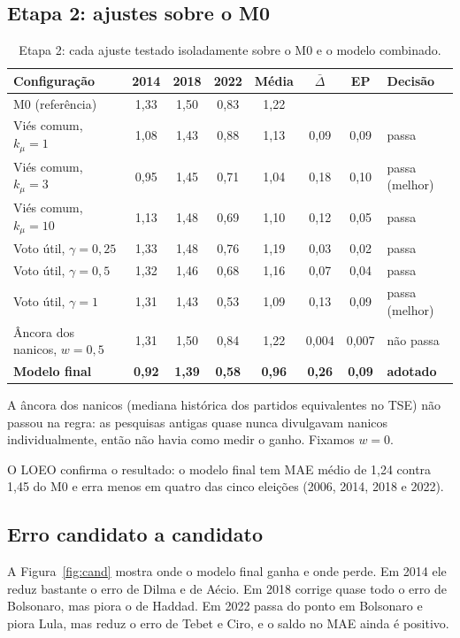 \documentclass[10.5pt,a4paper]{article}
\begin{document}
\subsection{Etapa 2: ajustes sobre o M0}
\begin{table}[h]
\centering\small
\caption{Etapa 2: cada ajuste testado isoladamente sobre o M0 e o modelo combinado.}
\label{tab:etapa2}
\begin{tabular}{lccccccl}
\toprule
Configuração & 2014 & 2018 & 2022 & Média & $\bar\Delta$ & EP & Decisão \\
\midrule
M0 (referência) & 1,33 & 1,50 & 0,83 & 1,22 & & & \\
\midrule
Viés comum, $k_\mu=1$ & 1,08 & 1,43 & 0,88 & 1,13 & 0,09 & 0,09 & passa \\
\rowcolor{azulclaro} Viés comum, $k_\mu=3$ & 0,95 & 1,45 & 0,71 & 1,04 & 0,18 & 0,10 & passa (melhor) \\
Viés comum, $k_\mu=10$ & 1,13 & 1,48 & 0,69 & 1,10 & 0,12 & 0,05 & passa \\
\midrule
Voto útil, $\gamma=0{,}25$ & 1,33 & 1,48 & 0,76 & 1,19 & 0,03 & 0,02 & passa \\
Voto útil, $\gamma=0{,}5$ & 1,32 & 1,46 & 0,68 & 1,16 & 0,07 & 0,04 & passa \\
\rowcolor{azulclaro} Voto útil, $\gamma=1$ & 1,31 & 1,43 & 0,53 & 1,09 & 0,13 & 0,09 & passa (melhor) \\
\midrule
Âncora dos nanicos, $w=0{,}5$ & 1,31 & 1,50 & 0,84 & 1,22 & 0,004 & 0,007 & não passa \\
\midrule
\rowcolor{verde!12} \textbf{Modelo final} & \textbf{0,92} & \textbf{1,39} & \textbf{0,58} & \textbf{0,96} & \textbf{0,26} & \textbf{0,09} & \textbf{adotado} \\
\bottomrule
\end{tabular}
\end{table}

A âncora dos nanicos (mediana histórica dos partidos equivalentes no TSE) não passou na regra: as pesquisas antigas quase nunca divulgavam nanicos individualmente, então não havia como medir o ganho. Fixamos $w=0$.

O LOEO confirma o resultado: o modelo final tem MAE médio de 1,24 contra 1,45 do M0 e erra menos em quatro das cinco eleições (2006, 2014, 2018 e 2022).

\subsection{Erro candidato a candidato}
A Figura~\ref{fig:cand} mostra onde o modelo final ganha e onde perde. Em 2014 ele reduz bastante o erro de Dilma e de Aécio. Em 2018 corrige quase todo o erro de Bolsonaro, mas piora o de Haddad. Em 2022 passa do ponto em Bolsonaro e piora Lula, mas reduz o erro de Tebet e Ciro, e o saldo no MAE ainda é positivo.
\end{document}
